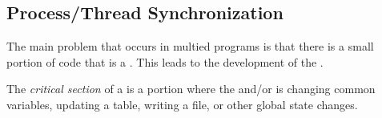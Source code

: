 \subsection{Process/Thread Synchronization}\label{subsec:Synchronization}
The main problem that occurs in multied programs is that there is a small portion of code that is a .
This leads to the development of the .

\begin{definition}\label{def:Critical_Section}
  The \emph{critical section} of a  is a portion where the  and/or  is changing common variables, updating a table, writing a file, or other global state changes.
\end{definition}


